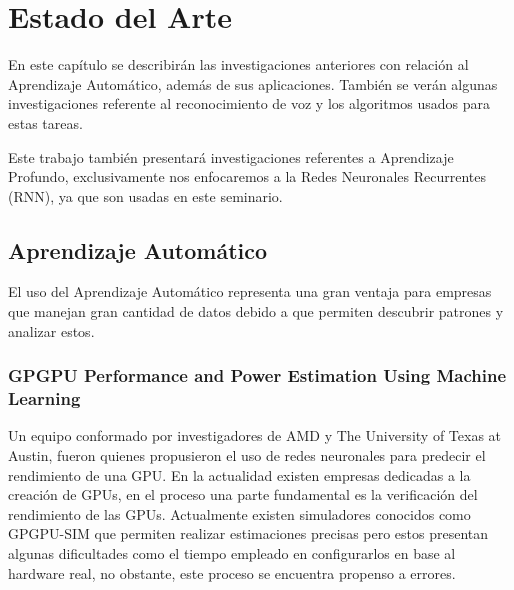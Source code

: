 \chapter{Estado del Arte}
En este capítulo se describirán las investigaciones anteriores con relación al Aprendizaje Automático, además de sus aplicaciones. También se verán algunas investigaciones referente al reconocimiento de voz y los algoritmos usados para estas tareas.

Este trabajo también presentará investigaciones referentes a Aprendizaje Profundo, exclusivamente nos enfocaremos a la Redes Neuronales Recurrentes (RNN), ya que son usadas en este seminario.




\section{Aprendizaje Automático}
El uso del Aprendizaje Automático representa una gran ventaja para empresas que manejan gran cantidad de datos debido a que permiten descubrir patrones y analizar estos.

\subsection{GPGPU Performance and Power Estimation Using Machine Learning}
Un equipo conformado por investigadores\cite{GPU} de AMD y The University of Texas at Austin, fueron quienes propusieron el uso de redes neuronales para predecir el rendimiento de una GPU.
En la actualidad existen empresas dedicadas a la creación de GPUs, en el proceso una parte fundamental es la verificación del rendimiento de las GPUs. Actualmente existen simuladores conocidos como GPGPU-SIM que permiten realizar estimaciones precisas pero estos presentan algunas dificultades como el tiempo empleado en configurarlos en base al hardware real, no obstante, este proceso se encuentra propenso a errores. 
